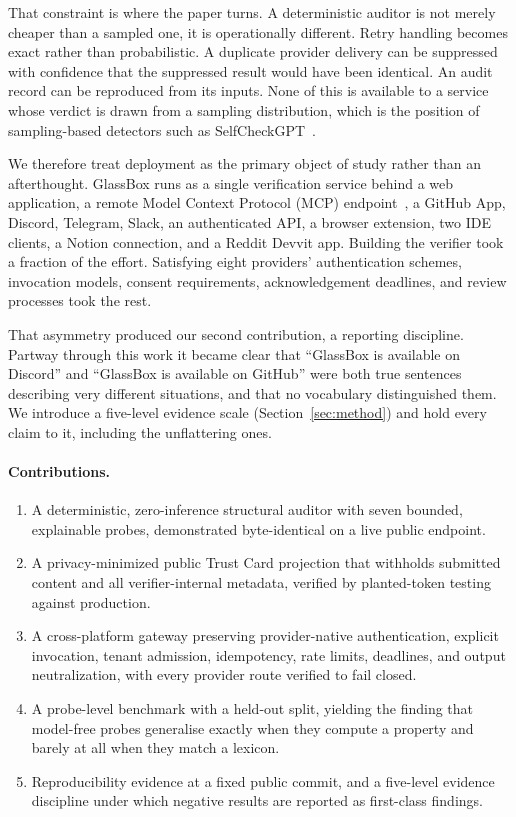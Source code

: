 That constraint is where the paper turns. A deterministic auditor is not merely cheaper
than a sampled one, it is operationally different. Retry handling becomes exact rather
than probabilistic. A duplicate provider delivery can be suppressed with confidence that
the suppressed result would have been identical. An audit record can be reproduced from
its inputs. None of this is available to a service whose verdict is drawn from a sampling
distribution, which is the position of sampling-based detectors such as
SelfCheckGPT~\cite{manakul2023selfcheckgpt}.

We therefore treat deployment as the primary object of study rather than an afterthought.
GlassBox runs as a single verification service behind a web application, a remote Model
Context Protocol (MCP) endpoint~\cite{mcp2025spec}, a GitHub App, Discord, Telegram,
Slack, an authenticated API, a browser extension, two IDE clients, a Notion connection,
and a Reddit Devvit app. Building the verifier took a fraction of the effort. Satisfying
eight providers' authentication schemes, invocation models, consent requirements,
acknowledgement deadlines, and review processes took the rest.

That asymmetry produced our second contribution, a reporting discipline. Partway through
this work it became clear that ``GlassBox is available on Discord'' and ``GlassBox is
available on GitHub'' were both true sentences describing very different situations, and
that no vocabulary distinguished them. We introduce a five-level evidence scale
(Section~\ref{sec:method}) and hold every claim to it, including the unflattering ones.

\paragraph{Contributions.}
\begin{enumerate}[leftmargin=1.15em,itemsep=1pt,topsep=2pt]
\item A deterministic, zero-inference structural auditor with seven bounded, explainable
probes, demonstrated byte-identical on a live public endpoint.
\item A privacy-minimized public Trust Card projection that withholds submitted content
and all verifier-internal metadata, verified by planted-token testing against production.
\item A cross-platform gateway preserving provider-native authentication, explicit
invocation, tenant admission, idempotency, rate limits, deadlines, and output
neutralization, with every provider route verified to fail closed.
\item A probe-level benchmark with a held-out split, yielding the finding that model-free
probes generalise exactly when they compute a property and barely at all when they match a
lexicon.
\item Reproducibility evidence at a fixed public commit, and a five-level evidence
discipline under which negative results are reported as first-class findings.
\end{enumerate}

